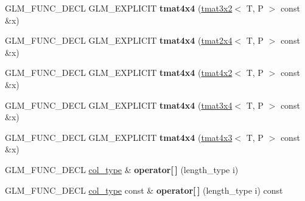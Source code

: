 \begin{DoxyCompactItemize}
\item 
\mbox{\label{structglm_1_1tmat4x4_aebc9c223de2814546e636fa023185bcb}} 
G\+L\+M\+\_\+\+F\+U\+N\+C\+\_\+\+D\+E\+CL G\+L\+M\+\_\+\+E\+X\+P\+L\+I\+C\+IT {\bfseries tmat4x4} (\hyperlink{structglm_1_1tmat3x2}{tmat3x2}$<$ T, P $>$ const \&x)
\item 
\mbox{\label{structglm_1_1tmat4x4_a2bbdcb0143f39ec4fe8319cc6ceaedd5}} 
G\+L\+M\+\_\+\+F\+U\+N\+C\+\_\+\+D\+E\+CL G\+L\+M\+\_\+\+E\+X\+P\+L\+I\+C\+IT {\bfseries tmat4x4} (\hyperlink{structglm_1_1tmat2x4}{tmat2x4}$<$ T, P $>$ const \&x)
\item 
\mbox{\label{structglm_1_1tmat4x4_a23f17aeae300219c962944a180316819}} 
G\+L\+M\+\_\+\+F\+U\+N\+C\+\_\+\+D\+E\+CL G\+L\+M\+\_\+\+E\+X\+P\+L\+I\+C\+IT {\bfseries tmat4x4} (\hyperlink{structglm_1_1tmat4x2}{tmat4x2}$<$ T, P $>$ const \&x)
\item 
\mbox{\label{structglm_1_1tmat4x4_ad15d9ef57895ed333b7f6d857ac14306}} 
G\+L\+M\+\_\+\+F\+U\+N\+C\+\_\+\+D\+E\+CL G\+L\+M\+\_\+\+E\+X\+P\+L\+I\+C\+IT {\bfseries tmat4x4} (\hyperlink{structglm_1_1tmat3x4}{tmat3x4}$<$ T, P $>$ const \&x)
\item 
\mbox{\label{structglm_1_1tmat4x4_a1826c29cae061983cde9d9dc860bc637}} 
G\+L\+M\+\_\+\+F\+U\+N\+C\+\_\+\+D\+E\+CL G\+L\+M\+\_\+\+E\+X\+P\+L\+I\+C\+IT {\bfseries tmat4x4} (\hyperlink{structglm_1_1tmat4x3}{tmat4x3}$<$ T, P $>$ const \&x)
\item 
\mbox{\label{structglm_1_1tmat4x4_a4be08a6a3f8cb1f0954c2d0347961582}} 
G\+L\+M\+\_\+\+F\+U\+N\+C\+\_\+\+D\+E\+CL \hyperlink{structglm_1_1tvec4}{col\+\_\+type} \& {\bfseries operator\mbox{[}$\,$\mbox{]}} (length\+\_\+type i)
\item 
\mbox{\label{structglm_1_1tmat4x4_a0b1cbaaefe0ad2cb8f7047e957e58841}} 
G\+L\+M\+\_\+\+F\+U\+N\+C\+\_\+\+D\+E\+CL \hyperlink{structglm_1_1tvec4}{col\+\_\+type} const  \& {\bfseries operator\mbox{[}$\,$\mbox{]}} (length\+\_\+type i) const
\item 
\mbox{\label{structglm_1_1tmat4x4_aeccf1c71ba2e06f4ce199da93767928e}} 

\end{DoxyCompactItemize}
